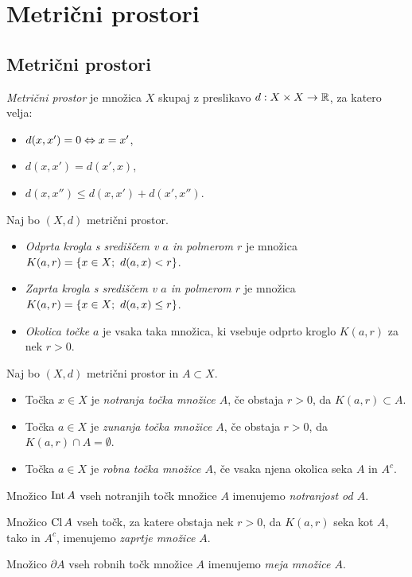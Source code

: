 \section*{Metrični prostori}
\subsection{Metrični prostori}
\begin{definicija}
    \emph{Metrični prostor} je množica $X$ skupaj z preslikavo $d: X \times X \to \mathbb{R}$, za katero velja:
    \begin{itemize}
        \item $d(x, x') = 0 \Leftrightarrow x=x'$,
        \item $d(x, x') = d(x', x)$,
        \item $d(x, x'') \leq d(x, x') + d(x', x'')$.
    \end{itemize}
\end{definicija}

\begin{definicija}
    Naj bo $(X, d)$ metrični prostor. 
    \begin{itemize}
        \item \emph{Odprta krogla s središčem v $a$ in polmerom $r$} je množica $K(a, r) = \left\{x \in X; \ d(a,x) < r\right\}$.
        \item \emph{Zaprta krogla s središčem v $a$ in polmerom $r$} je množica $K(a, r) = \left\{x \in X; \ d(a,x) \leq r\right\}$. 
        \item \emph{Okolica točke} $a$ je vsaka taka množica, ki vsebuje odprto kroglo $K(a, r)$ za nek $r>0$.
    \end{itemize}    
\end{definicija}

\begin{definicija}
    Naj bo $(X, d)$ metrični prostor in $A \subset X$.
    \begin{itemize}
        \item Točka $x \in X$ je \emph{notranja točka množice $A$}, če obstaja $r>0$, da $K(a,r) \subset A$.
        \item Točka $a \in X$ je \emph{zunanja točka množice $A$}, če obstaja $r>0$, da $K(a,r) \cap A = \emptyset$.
        \item Točka $a \in X$ je \emph{robna točka množice $A$}, če vsaka njena okolica seka $A$ in $A^c$.
    \end{itemize}
    Množico $\operatorname{Int} A$ vseh notranjih točk množice $A$ imenujemo \emph{notranjost od $A$}. 

    Množico $\operatorname{Cl} A$ vseh točk, za katere obstaja nek $r>0$, da $K(a, r)$ seka kot $A$, tako in $A^c$, imenujemo \emph{zaprtje množice $A$}.
    
    Množico $\partial A$ vseh robnih točk množice $A$ imenujemo \emph{meja množice $A$}.     
\end{definicija}

